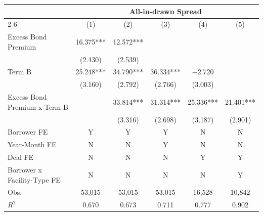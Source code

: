 {
\def\sym#1{\ifmmode^{#1}\else\(^{#1}\)\fi}
\begin{tabular}{l*{5}{c}}
\toprule\toprule
                                        &\multicolumn{5}{c}{All-in-drawn Spread}                                        \\\cmidrule(lr){2-6}
                                        &\multicolumn{1}{c}{(1)}   &\multicolumn{1}{c}{(2)}   &\multicolumn{1}{c}{(3)}   &\multicolumn{1}{c}{(4)}   &\multicolumn{1}{c}{(5)}   \\
\toprule
Excess Bond Premium                     &      16.375***&      12.572***&               &               &               \\
                                        &     (2.430)   &     (2.539)   &               &               &               \\
[1em]
Term B                                  &      25.248***&      34.790***&      36.334***&    $-$2.720   &               \\
                                        &     (3.160)   &     (2.792)   &     (2.766)   &     (3.003)   &               \\
[1em]
Excess Bond Premium x Term B            &               &      33.814***&      31.314***&      25.336***&      21.401***\\
                                        &               &     (3.316)   &     (2.698)   &     (3.187)   &     (2.901)   \\
\toprule
Borrower FE                             &           Y   &           Y   &           Y   &           N   &           N   \\
Year-Month FE                           &           N   &           N   &           Y   &           N   &           N   \\
Deal FE                                 &           N   &           N   &           N   &           Y   &           Y   \\
Borrower x Facility-Type FE             &           N   &           N   &           N   &           N   &           Y   \\
Obs.                                    &      53,015   &      53,015   &      53,015   &      16,528   &      10,842   \\
$R^2$                                   &       0.670   &       0.673   &       0.711   &       0.777   &       0.902   \\
\toprule\toprule
\end{tabular}
}
